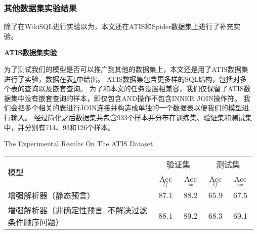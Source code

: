 \subsubsection{其他数据集实验结果}

除了在WikiSQL进行实验以为，本文还在ATIS\cite{Dahl1994Expanding}和Spider数据集\cite{yu2018spider}上进行了补充实验。

\textbf{ATIS数据集实验}

为了测试我们的模型是否可以推广到其他的数据集上，本文还是用了ATIS数据集进行了实验，数据在表\ref{tab:asjjsdsyjg}中给出。
ATIS数据集包含更多样的SQL结构，包括对多个表的查询以及嵌套查询。
为了和本文的任务设置相兼容，我们仅保留了ATIS数据集中没有嵌套查询的样本，即仅包含AND操作不包含INNER JOIN操作符。
我们会把多个相关的表进行JOIN连接并构造成单独的一个数据表以便我们的模型进行输入。
经过简化之后数据集共包含933个样本并分布在训练集、验证集和测试集中，并分别有714、93和126个样本。

\begin{table}[!htpb]
    {The Experimental Results On The ATIS Dataset}
  \label{tab:asjjsdsyjg}
  \centering
  \begin{threeparttable}[b]
     \begin{tabular}{lcccc}
      \toprule
      \multirow{2}{10mm}{模型}&\multicolumn{2}{c}{验证集} & \multicolumn{2}{c}{测试集}\\
      \cmidrule(lr){2-3}\cmidrule(lr){4-5}
      & Acc$_{lf}$ & Acc$_{ex}$ & Acc$_{lf}$ & Acc$_{ex}$\\
      \midrule
      增强解析器（静态预言） & 87.1 & 88.2 & 65.9 & 67.5\\
      增强解析器（非确定性预言, 不解决过滤条件顺序问题） & 88.1 & 89.2 & 68.3 & 69.1\\
      \bottomrule
    \end{tabular}
  \end{threeparttable}
\end{table}

